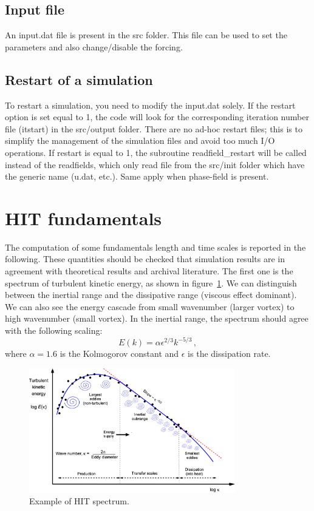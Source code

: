 \documentclass[11pt]{article}
\begin{document}
\subsection{Input file}
An input.dat file is present in the src folder. 
This file can be used to set the parameters and also change/disable the forcing.

\subsection{Restart of a simulation}
To restart a simulation, you need to modify the input.dat solely.
If the restart option is set equal to 1, the code will look for the corresponding iteration number file (itstart) in the src/output folder.
There are no ad-hoc restart files; this is to simplify the management of the simulation files and avoid too much I/O operations.
If restart is equal to 1, the subroutine readfield\_restart will be called instead of the readfields, which only read file from the src/init folder which have the generic name (u.dat, etc.).
Same apply when phase-field is present. 

\section{HIT fundamentals}

The computation of some fundamentals length and time scales is reported in the following.
These quantities should be checked that simulation results are in agreement with theoretical results and archival literature.
The first one is the spectrum of turbulent kinetic energy, as shown in figure~\ref{spectra}.
We can distinguish between the inertial range and the dissipative range (viscous effect dominant).
We can also see the energy cascade from small wavenumber (larger vortex) to high wavenumber (small vortex).
In the inertial range, the spectrum should agree with the following scaling:
\begin{equation}
E(k)=\alpha \epsilon^{2/3} k^{-5/3}\, ,
\end{equation}
where $\alpha=1.6$ is the Kolmogorov constant and $\epsilon$ is the dissipation rate.

\begin{figure}[!t]
\centering
    \includegraphics[width=0.8\textwidth]{spectra.png} 
    \caption{Example of HIT spectrum.}
    \label{spectra}
\end{figure}
\end{document}
